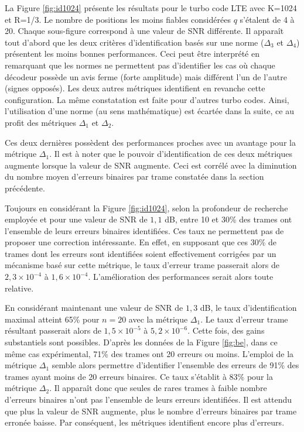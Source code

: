 La Figure \ref{fig:id1024} présente les résultats pour le turbo code LTE avec K=1024 et R=1/3. Le nombre de positions les moins fiables
considérées $q$ s'étalent de 4 à 20. Chaque sous-figure correspond à une valeur de SNR différente. Il apparaît tout d'abord que 
les deux critères d'identification basés sur une norme ($\Delta_3$ et $\Delta_4$) présentent les moins bonnes performances.
 Ceci peut être interprété en remarquant que les normes ne permettent pas d'identifier les
cas où chaque décodeur possède un avis ferme (forte amplitude) mais différent l'un de l'autre (signes opposés). Les deux 
autres métriques identifient en revanche cette configuration. La même constatation est faite pour d'autres turbo codes. 
Ainsi, l'utilisation d'une norme (au sens mathématique) est écartée dans la suite, ce au profit des métriques $\Delta_1$ 
et $\Delta_2$.

Ces deux dernières possèdent des performances proches avec un avantage pour la métrique $\Delta_1$. Il est à noter que le pouvoir 
d'identification de ces deux métriques augmente lorsque la valeur de SNR augmente. Ceci est corrélé avec la diminution du 
nombre moyen d'erreurs binaires par trame constatée dans la section précédente.

Toujours en considérant la Figure \ref{fig:id1024}, selon la profondeur de recherche employée et pour une valeur de SNR 
de $1,1$ dB, entre 10 et 30\% des trames ont l'ensemble de leurs erreurs binaires identifiées. Ces taux ne 
permettent pas de proposer une correction intéressante. En effet, en supposant que ces 30\% de trames dont les erreurs sont 
identifiées soient effectivement corrigées par un mécanisme basé sur cette métrique, le taux d'erreur trame passerait alors 
de $2,3\times 10^{-4}$ à $1,6\times 10^{-4}$. L'amélioration des performances serait alors toute relative.

En considérant maintenant une valeur de SNR de $1,3$ dB, le taux d'identification maximal atteint 65\% pour $n=20$ avec la 
métrique $\Delta_1$. Le taux d'erreur trame résultant passerait alors de 
$1,5\times 10^{-5}$ à $5,2\times 10^{-6}$. Cette fois, des gains substantiels sont possibles. D'après les données de la 
Figure \ref{fig:be}, dans ce même cas expérimental, 71\% des trames ont 20 erreurs ou moins. 
L'emploi de la métrique $\Delta_1$ semble alors permettre d'identifier l'ensemble des erreurs de 91\% des trames ayant 
moins de 20 erreurs binaires. Ce taux s'établit à 83\% pour la métrique $\Delta_2$. 
Il apparaît donc que seules de rares trames à faible nombre d'erreurs binaires n'ont pas l'ensemble de leurs erreurs
identifiées. Il est attendu que plus la valeur de SNR augmente, plus le nombre d'erreurs binaires par trame erronée 
baisse. Par conséquent, les métriques identifient encore plus d'erreurs.

